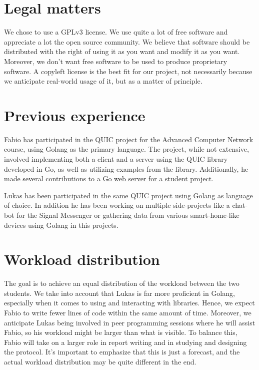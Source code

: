 \documentclass[a4paper,english,10pt,NET]{tumarticle}
\begin{document}
\section{Legal matters}


We chose to use a GPLv3 license.
We use quite a lot of free software and appreciate a lot the open source community. We believe that software should be distributed with the right of using it as you want and modify it as you want. Moreover, we don't want free software to be used to produce proprietary software. A copyleft license is the best fit for our project, not necessarily because we anticipate real-world usage of it, but as a matter of principle.


\section{Previous experience}

Fabio has participated in the QUIC project for the Advanced Computer Network course, using Golang as the primary language. The project, while not extensive, involved implementing both a client and a server using the QUIC library developed in Go, as well as utilizing examples from the library. Additionally, he made several contributions to a \href{https://github.com/csunibo/polleg}{Go web server for a student project}.

Lukas has been participated in the same QUIC project using Golang as language of choice.
In addition he has been working on multiple side-projects like a chat-bot for the Signal Messenger or gathering data from various smart-home-like devices using Golang in this projects.


\section{Workload distribution}

The goal is to achieve an equal distribution of the workload between the two students. We take into account that Lukas is far more proficient in Golang, especially when it comes to using and interacting with libraries. Hence, we expect Fabio to write fewer lines of code within the same amount of time. Moreover, we anticipate Lukas being involved in peer programming sessions where he will assist Fabio, so his workload might be larger than what is visible. To balance this, Fabio will take on a larger role in report writing and in studying and designing the protocol. It's important to emphasize that this is just a forecast, and the actual workload distribution may be quite different in the end.


\todos
\end{document}
